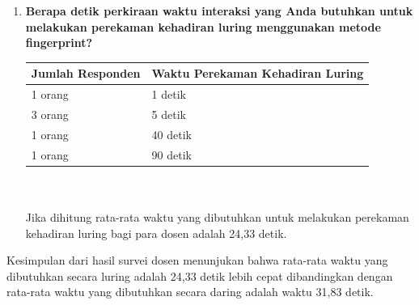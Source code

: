 \documentclass[a4paper,twoside]{article}
\begin{document}
\begin{enumerate}
\begin{enumerate}
			\item \textbf{Berapa detik perkiraan waktu interaksi yang Anda butuhkan untuk melakukan perekaman kehadiran luring menggunakan metode fingerprint?}\\
			\begin{tabular}{|p{4cm} |p{7cm}|}
				\hline
				Jumlah Responden &  Waktu Perekaman Kehadiran Luring \\ \hline     
				1 orang &  1 detik\\ \hline 
				3 orang &  5 detik\\ \hline 
				1 orang &  40 detik\\ \hline 
				1 orang &  90 detik\\ \hline 
			\end{tabular}\\ \\
			Jika dihitung rata-rata waktu yang dibutuhkan untuk melakukan perekaman kehadiran luring bagi para dosen adalah 24,33 detik.
		\end{enumerate}
		Kesimpulan dari hasil survei dosen menunjukan bahwa rata-rata waktu yang dibutuhkan secara luring adalah 24,33 detik lebih cepat dibandingkan dengan rata-rata waktu yang dibutuhkan secara daring adalah waktu 31,83 detik. 
		

\end{enumerate}
\end{document}
